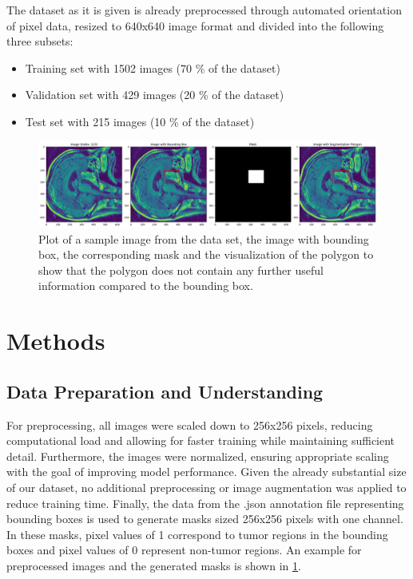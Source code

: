 \documentclass[lettersize,journal]{IEEEtran}
\begin{document}
The dataset as it is given is already preprocessed through automated orientation of pixel data, resized to 640x640 image format and divided into the following three subsets:

\begin{itemize}
  \item Training set with 1502 images (70 \% of the dataset)
  \item Validation set with 429 images (20 \% of the dataset)
  \item Test set with 215 images (10 \% of the dataset)
\end{itemize}

\begin{figure}[h]
  \centering
  \includegraphics[width=\textwidth]{images/du_image_and_mask.png}
  \caption{Plot of a sample image from the data set, the image with bounding box, the corresponding mask and the visualization of the polygon to show that the polygon does not contain any further useful information compared to the bounding box.}
  \label{fig:da_image_and_mask}
\end{figure}

\section[Methods]{Methods}

\subsection{Data Preparation and Understanding}
For preprocessing, all images were scaled down to 256x256 pixels, reducing computational load and allowing for faster training while maintaining sufficient detail. Furthermore, the images were normalized, ensuring appropriate scaling with the goal of improving model performance. Given the already substantial size of our dataset, no additional preprocessing or image augmentation was applied to reduce training time.
Finally, the data from the .json annotation file representing bounding boxes is used to generate masks sized 256x256 pixels with one channel. In these masks, pixel values of 1 correspond to tumor regions in the bounding boxes and pixel values of 0 represent non-tumor regions. An example for preprocessed images and the generated masks is shown in \cref{fig:da_image_and_mask}.
\end{document}
